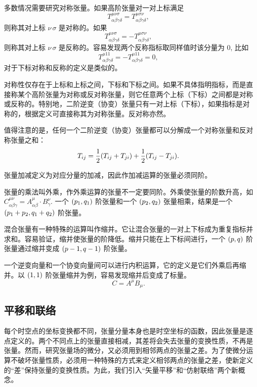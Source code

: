 \documentclass[UTF8, 12pt, a4paper, oneside, onecolumn, fontset=none]{ctexart}
\begin{document}
多数情况需要研究对称张量。如果高阶张量对一对上标满足
\begin{equation}
T^{\mu\nu\sigma}_{\alpha\beta\gamma\delta}=T^{\mu\sigma\nu}_{\alpha\beta\gamma\delta},
\end{equation}
则称其对上标 $\nu\,\sigma$ 是对称的。如果
\begin{equation}
T^{\mu\nu\sigma}_{\alpha\beta\gamma\delta}=-T^{\mu\sigma\nu}_{\alpha\beta\gamma\delta},
\end{equation}
则称其对上标 $\nu\,\sigma$ 是反称的。容易发现两个反称指标取同样值时该分量为 0, 比如
\begin{equation}
T^{\mu11}_{\alpha\beta\gamma\delta}=-T^{\mu11}_{\alpha\beta\gamma\delta}=0,
\end{equation}
对于下标对称和反称的定义是类似的。

对称性仅存在于上标和上标之间，下标和下标之间。如果不具体指明指标，而是直接称某个高阶张量为对称或反对称张量，则它任意两个上标（下标）之间都是对称或反称的。特别地，二阶逆变（协变）张量只有一对上标（下标），如果指标是对称的，根据定义可直接称其为对称张量。反对称亦然。

值得注意的是，任何一个二阶逆变（协变）张量都可以分解成一个对称张量和反对称张量之和：
\begin{equation}
T_{ij}=\frac{1}{2}\mleft(T_{ij}+T_{ji}\mright)+\frac{1}{2}\mleft(T_{ij}-T_{ji}\mright).
\end{equation}

张量加减定义为对应分量的加减，因此作加减运算的张量必须同阶。

张量的乘法叫外乘，作外乘运算的张量不一定要同阶。外乘使张量的阶数升高，如 $C_{\alpha\beta\gamma}^{\mu\nu}=A_{\alpha\beta}^{\mu}\cdot B_{\gamma}^{\nu}$. 一个 $\mleft(p_{1}, q_{1}\mright)$ 阶张量和一个 $\mleft(p_{2}, q_{2}\mright)$ 张量相乘，结果是一个 $\mleft(p_{1}+p_{2}, q_{1}+q_{2}\mright)$ 阶张量。

混合张量有一种特殊的运算叫作缩并。它让混合张量的⼀对上下标成为重复指标并求和。容易验证，缩并使张量的阶降低。缩并只能在上下标间进行，一个 $\mleft(p, q\mright)$ 阶张量通过缩并变成 $\mleft(p-1, q-1\mright)$ 阶张量。

一个逆变向量和一个协变向量间可以进行内积运算，它的定义是它们外乘后再缩并。以 $\mleft(1, 1\mright)$ 阶张量缩并为例，容易发现缩并后变成了标量。
\begin{equation}
C=A^{\mu}B_{\mu}.
\end{equation}

\subsection{平移和联络}
每个时空点的坐标变换都不同，张量分量本身也是时空坐标的函数，因此张量是逐点定义的。两个不同点上的张量直接相减，其差将会失去张量的变换性质，不再是张量。然⽽，研究张量场的微分，又必须⽤到相邻两点的张量之差。为了使微分运算不破坏张量性质，必须⽤⼀种特殊的⽅式来定义相邻两点的张量之差，使新定义的“差”保持张量的变换性质。为此，我们引⼊“⽮量平移”和“仿射联络”两个新概念。
\end{document}
